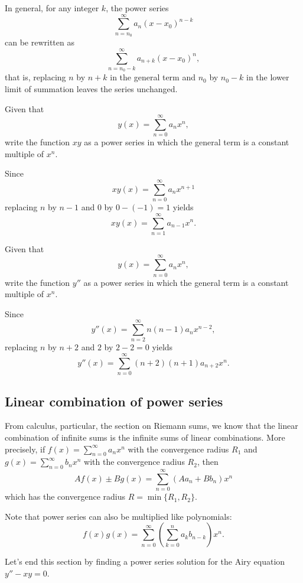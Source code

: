 In general, for any integer $k$, the power series
\[\sum\limits_{n = n_0}^\infty a_n ( x - x_0)^{n - k}\]
can be rewritten as
\[\sum\limits_{n = n_0-k}^\infty a_{n+k} ( x - x_0)^{n},\]
that is, replacing $n$ by $n + k$ in the general term and $n_0$ by $n_0-k$ in the lower limit of summation leaves the series unchanged.

\begin{example}
Given that
\[y(x)=\sum_{n=0}^\infty a_nx^n,\]
write the function $xy$ as a power series in which the general term is a constant multiple of $x^n$.
\end{example}
\begin{solution}
  Since 
  \[xy(x)=\sum_{n=0}^\infty a_nx^{n+1}\]
  replacing $n$ by $n-1$ and $0$ by $0-(-1)=1$ yields
  \[xy(x)=\sum_{n=1}^\infty a_{n-1}x^n.\]
\end{solution}

\begin{exercise}
Given that
\[y(x)=\sum_{n=0}^\infty a_nx^n,\]
write the function $y''$ as a power series in which the general term is a constant multiple of $x^n$.
\end{exercise}
\begin{exersol}
Since
  \[y''(x)=\sum_{n=2}^\infty n(n-1)a_nx^{n-2},\]
replacing $n$ by $n+2$ and $2$ by $2-2=0$ yields
\[y''(x)=\sum_{n=0}^\infty (n+2)(n+1)a_{n+2}x^n.\]
\end{exersol}

\subsection*{Linear combination of power series}

From calculus, particular, the section on Riemann sums, we know that the linear combination of infinite sums is the infinite sums of linear combinations. More precisely, if $f(x)=\sum\limits_{n=0}^\infty a_nx^n$ with the convergence radius $R_1$ and $g(x)=\sum\limits_{n=0}^\infty b_nx^n$ with the convergence radius $R_2$, then
\[A f(x)\pm B g(x)=\sum\limits_{n= 0}^\infty (Aa_n+Bb_n)x^n\] 
which has the convergence radius $R=\min\{R_1, R_2\}$.

Note that power series can also be multiplied like polynomials:
\[f(x)g(x)=\sum\limits_{n=0}^\infty\left(\sum\limits_{k=0}^n a_kb_{n-k}\right)x^n.\]

Let's end this section by finding a power series solution for the Airy equation $y''-xy=0$. 

